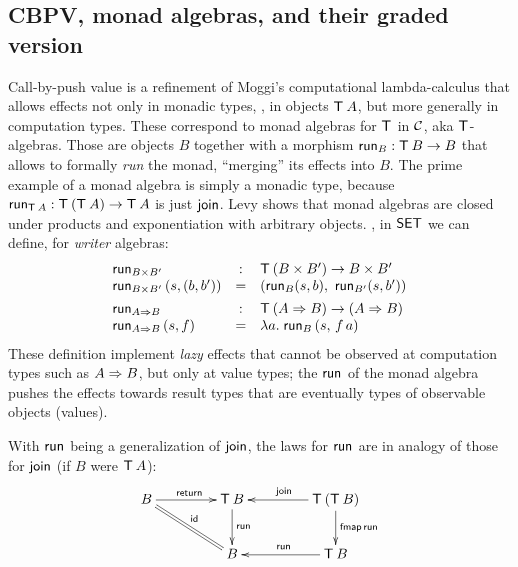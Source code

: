 \documentclass[acmsmall,review,anonymous]{acmart}\settopmatter{printfolios=true,printccs=false,printacmref=false}
\begin{document}
\subsection{CBPV, monad algebras, and their graded version}
\label{sec:graded_algebra}

Call-by-push value \cite{levy:hosc06} is a refinement of Moggi's
computational lambda-calculus \cite{moggi:infcomp91} that allows effects
not only in monadic types, \ie, in objects $\T\,A$, but more generally
in computation types.  These correspond to monad algebras for $\T$ in $\CC$,
aka $\T$-algebras.
Those are objects $B$ together with a morphism $\run[B] : \T\,B
\to B$ that allows to formally \emph{run} the monad, ``merging'' its
effects into $B$.
The prime example of a monad algebra is simply a monadic
type, because $\run[\T\,A] : \T\,(\T\,A) \to \T\,A$ is just
$\tjoin$.  Levy \citeyearpar{levy:hosc06} shows that monad algebras are
closed under products and exponentiation with arbitrary objects.  \Eg,
in $\SET$ we can define, for \emph{writer} algebras:
\[
\begin{array}{lcl}
  \run[B \times B'] & : & \T\,(B \times B') \to B \times B' \\
  \run[B \times B']\, (s,(b,b')) & = & (\run[B] (s,b),\
                                           \run[B'] (s,b'))
\\[1ex]
  \run[A \To B] & : & \T\,(A \To B) \to (A \To B) \\
  \run[A \To B]\, (s,f) & = & \lambda a.\; \run[B]\,(s,\,f\,a)
\\
\end{array}
\]
These definition implement \emph{lazy} effects that cannot be observed
at computation types such as $A \To B$, but only at value types; the
$\run[]$ of the monad algebra pushes the effects towards result types
that are eventually types of observable objects (values).

With $\run[]$ being a generalization of $\tjoin$, the laws for $\run[]$
are in analogy of those for $\tjoin$ (if $B$ were $\T\,A$):
\[
\xymatrix@C=10ex{
  B     \ar[r]^{\treturn} \ar@{=}[dr]^{\tid}
& \T\,B \ar[d]^{\run[]}
& \T\,(\T\,B) \ar[l]_{\tjoin} \ar[d]^{\tfmap\,\run[]}
\\
& B
& \T\,B \ar[l]_{\run[]}
}
\]
\end{document}
